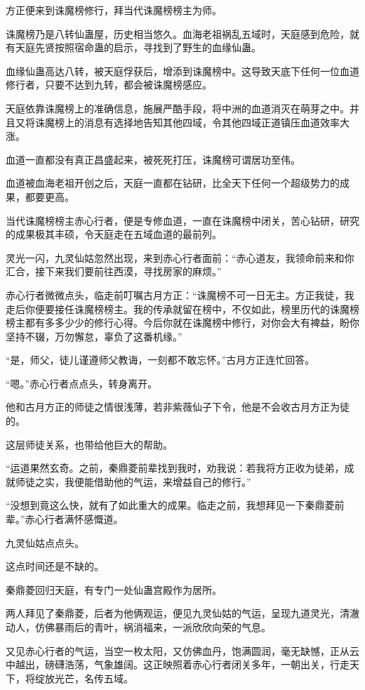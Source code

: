 \begin{this_body}
方正便来到诛魔榜修行，拜当代诛魔榜榜主为师。

诛魔榜乃是八转仙蛊屋，历史相当悠久。血海老祖祸乱五域时，天庭感到危险，就有天庭先贤按照宿命蛊的启示，寻找到了野生的血缘仙蛊。

血缘仙蛊高达八转，被天庭俘获后，增添到诛魔榜中。这导致天底下任何一位血道修行者，只要不达到九转，都会被诛魔榜感应。

天庭依靠诛魔榜上的准确信息，施展严酷手段，将中洲的血道消灭在萌芽之中。并且又将诛魔榜上的消息有选择地告知其他四域，令其他四域正道镇压血道效率大涨。

血道一直都没有真正昌盛起来，被死死打压，诛魔榜可谓居功至伟。

血道被血海老祖开创之后，天庭一直都在钻研，比全天下任何一个超级势力的成果，都要更高。

当代诛魔榜榜主赤心行者，便是专修血道，一直在诛魔榜中闭关，苦心钻研，研究的成果极其丰硕，令天庭走在五域血道的最前列。

灵光一闪，九灵仙姑忽然出现，来到赤心行者面前：“赤心道友，我领命前来和你汇合，接下来我们要前往西漠，寻找房家的麻烦。”

赤心行者微微点头，临走前叮嘱古月方正：“诛魔榜不可一日无主。方正我徒，我走后你便要接任诛魔榜榜主。我的传承就留在榜中，不仅如此，榜里历代的诛魔榜榜主都有多多少少的修行心得。今后你就在诛魔榜中修行，对你会大有裨益，盼你坚持不辍，万勿懈怠，辜负了这番机缘。”

“是，师父，徒儿谨遵师父教诲，一刻都不敢忘怀。”古月方正连忙回答。

“嗯。”赤心行者点点头，转身离开。

他和古月方正的师徒之情很浅薄，若非紫薇仙子下令，他是不会收古月方正为徒的。

这层师徒关系，也带给他巨大的帮助。

“运道果然玄奇。之前，秦鼎菱前辈找到我时，劝我说：若我将方正收为徒弟，成就师徒之实，我便能借助他的气运，来增益自己的修行。”

“没想到竟这么快，就有了如此重大的成果。临走之前，我想拜见一下秦鼎菱前辈。”赤心行者满怀感慨道。

九灵仙姑点点头。

这点时间还是不缺的。

秦鼎菱回归天庭，有专门一处仙蛊宫殿作为居所。

两人拜见了秦鼎菱，后者为他俩观运，便见九灵仙姑的气运，呈现九道灵光，清澈动人，仿佛暴雨后的青叶，祸消福来，一派欣欣向荣的气息。

又见赤心行者的气运，当空一枚太阳，又仿佛血丹，饱满圆润，毫无缺憾，正从云中越出，磅礴浩荡，气象雄阔。这正映照着赤心行者闭关多年，一朝出关，行走天下，将绽放光芒，名传五域。


\end{this_body}

